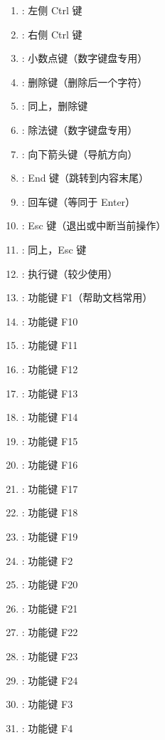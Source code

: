 \begin{enumerate}[label=\arabic*)]
    \item {}: 左侧 Ctrl 键
    \item {}: 右侧 Ctrl 键
    \item {}: 小数点键（数字键盘专用）
    \item {}: 删除键（删除后一个字符）
    \item {}: 同上，删除键
    \item {}: 除法键（数字键盘专用）
    \item {}: 向下箭头键（导航方向）
    \item {}: End 键（跳转到内容末尾）
    \item {}: 回车键（等同于 Enter）
    \item {}: Esc 键（退出或中断当前操作）
    \item {}: 同上，Esc 键
    \item {}: 执行键（较少使用）
    \item {}: 功能键 F1（帮助文档常用）
    \item {}: 功能键 F10
    \item {}: 功能键 F11
    \item {}: 功能键 F12
    \item {}: 功能键 F13
    \item {}: 功能键 F14
    \item {}: 功能键 F15
    \item {}: 功能键 F16
    \item {}: 功能键 F17
    \item {}: 功能键 F18
    \item {}: 功能键 F19
    \item {}: 功能键 F2
    \item {}: 功能键 F20
    \item {}: 功能键 F21
    \item {}: 功能键 F22
    \item {}: 功能键 F23
    \item {}: 功能键 F24
    \item {}: 功能键 F3
    \item {}: 功能键 F4

\end{enumerate}
